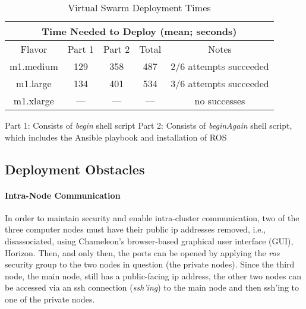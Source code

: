 \documentclass[9pt,twocolumn,twoside]{../../styles/osajnl}
\begin{document}
\begin{table} [htbp]
  \begin{threeparttable}
  \centering
  \caption{Virtual Swarm Deployment Times}
    \begin{tabular}{ccccc}
      \multicolumn{5}{c}{\bf Time Needed to Deploy (mean; seconds)}\\ \hline Flavor & Part 1 & Part 2 & Total & Notes\\ \hline m1.medium & 129 & 358 & 487 & 2/6 attempts succeeded \\ m1.large & 134 & 401 & 534 & 3/6 attempts succeeded \\ m1.xlarge & --- & --- & --- & no successes\\ \hline
    \end{tabular}
    \begin{tablenotes}
      \small
      \item Part 1: Consists of \textit{begin} shell script \newline  Part 2: Consists of \textit{beginAgain} shell script, which includes the Ansible playbook and installation of ROS 
    \end{tablenotes}
  \end{threeparttable}
\end{table}

\subsection{Deployment Obstacles}
\paragraph{Intra-Node Communication}
In order to maintain security and enable intra-cluster communication, two of the three computer nodes must have their public ip addresses removed, i.e., disassociated, using Chameleon's browser-based graphical user interface (GUI), Horizon.  Then, and only then, the ports can be opened by applying the \textit{ros} security group to the two nodes in question (the private nodes).  Since the third node, the main node, still has a public-facing ip address, the other two nodes can be accessed via an ssh connection (\textit{ssh'ing}) to the main node and then ssh'ing to one of the private nodes.
\end{document}
